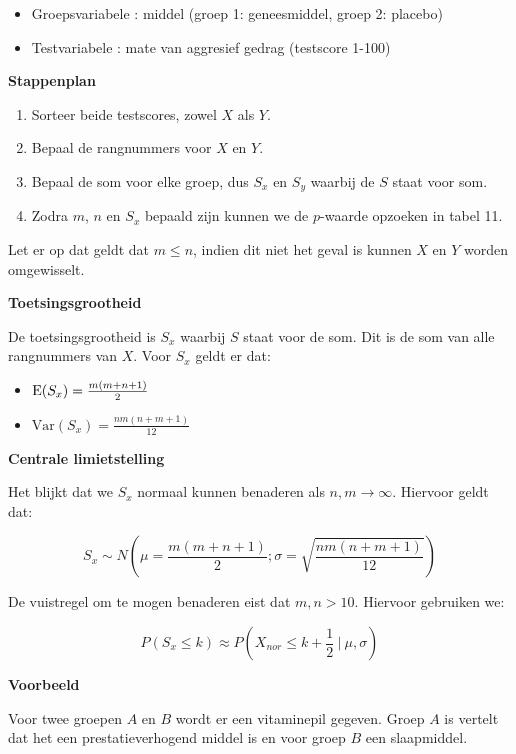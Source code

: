 \documentclass[11pt]{article}
\providecommand{\tightlist}{%
      \setlength{\itemsep}{0pt}\setlength{\parskip}{0pt}}
\begin{document}
\begin{itemize}
\tightlist
\item
  Groepsvariabele : middel (groep 1: geneesmiddel, groep 2: placebo)
\item
  Testvariabele : mate van aggresief gedrag (testscore 1-100)
\end{itemize}

\textbf{Stappenplan}

\begin{enumerate}
\def\labelenumi{\arabic{enumi}.}
\tightlist
\item
  Sorteer beide testscores, zowel \(X\) als \(Y\).
\item
  Bepaal de rangnummers voor \(X\) en \(Y\).
\item
  Bepaal de som voor elke groep, dus \(S_x\) en \(S_y\) waarbij de \(S\)
  staat voor som.
\item
  Zodra \(m\), \(n\) en \(S_x\) bepaald zijn kunnen we de \(p\)-waarde
  opzoeken in tabel 11.
\end{enumerate}

Let er op dat geldt dat \(m \leq n\), indien dit niet het geval is
kunnen \(X\) en \(Y\) worden omgewisselt.

\textbf{Toetsingsgrootheid}

De toetsingsgrootheid is \(S_x\) waarbij \(S\) staat voor de som. Dit is
de som van alle rangnummers van \(X\). Voor \(S_x\) geldt er dat:

\begin{itemize}
\tightlist
\item
  \(\textrm E(S_x) = \frac{m(m+n+1)}{2}\)
\item
  \(\textrm{Var}(S_x) = \frac{nm(n+m+1)}{12}\)
\end{itemize}

\textbf{Centrale limietstelling}

Het blijkt dat we \(S_x\) normaal kunnen benaderen als
\(n, m \rightarrow \infty\). Hiervoor geldt dat:

\[S_x \sim N\left(\mu=\frac{m(m+n+1)}{2}; \sigma=\sqrt{\frac{nm(n+m+1)}{12}}\right)\]

De vuistregel om te mogen benaderen eist dat \(m, n > 10\). Hiervoor
gebruiken we:

\[ P(S_x \leq k) \approx P\left(X_{nor} \leq k + \frac{1}{2}\ |\ \mu, \sigma\right) \]

\textbf{Voorbeeld}

    Voor twee groepen \(A\) en \(B\) wordt er een vitaminepil gegeven. Groep
\(A\) is vertelt dat het een prestatieverhogend middel is en voor groep
\(B\) een slaapmiddel.
\end{document}
